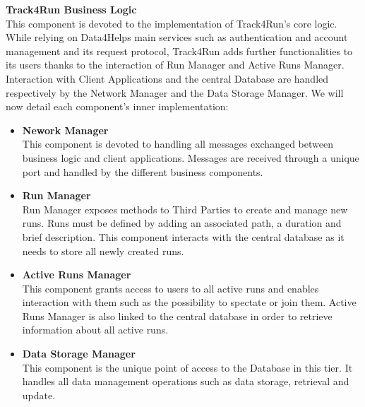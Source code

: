 \documentclass[titlepage]{article}
\begin{document}
{\bf Track4Run Business Logic }\\ 
This component is devoted to the implementation of Track4Run’s core logic. While relying on Data4Helps main services such as authentication and account management and its request protocol, Track4Run adds further functionalities to its users thanks to the interaction of Run Manager and Active Runs Manager. 
Interaction with Client Applications and the central Database are handled respectively by the Network Manager and the Data Storage Manager.
We will now detail each component’s inner implementation:
\begin{itemize}
        \item {\bf Nework Manager }\\
        This component is devoted to handling all messages exchanged between business logic and client applications. Messages are received through a unique port and handled by the different business components.
		\item {\bf Run Manager }\\
		Run Manager exposes methods to Third Parties  to create and manage new runs. Runs must be defined by adding an associated path, a duration and brief description. This component interacts with the central database as it needs to store all newly created runs.
		\item {\bf Active Runs Manager }\\
		This component grants access to users to all active runs and enables interaction with them such as the possibility to spectate or join them. Active Runs Manager is also linked to the central database in order to retrieve information about all active runs.
		\item {\bf Data Storage Manager }\\
		This component is the unique point of access to the Database in this tier. It handles all data management operations such as data storage, retrieval and update.
    \end{itemize}
\end{document}
